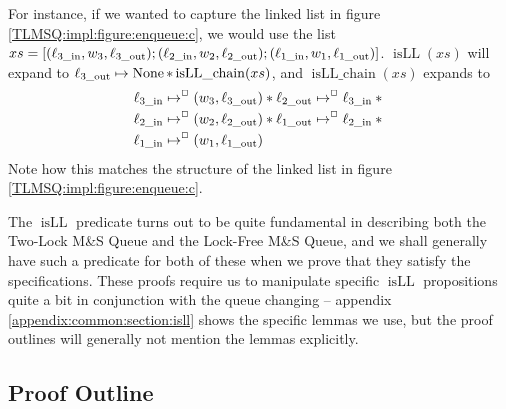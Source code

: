 \documentclass[a4paper, 10pt]{report}
\theoremstyle{definition}
\newcommand{\msq}{M\&S Queue}
\newcommand{\tlmsq}{Two-Lock \msq{}}
\newcommand{\lfmsq}{Lock-Free \msq{}}
\newcommand{\xsc}{xs}
\newcommand{\isLLchain}{\operatorname{isLL\_chain}}
\newcommand{\isLL}{\operatorname{isLL}}
\newcommand{\locinM}[1]{\loc_{#1\_\mathrm{in}}}
\newcommand{\locoutM}[1]{\loc_{#1\_\mathrm{out}}}
\newcommand{\nodeval}{\valB}
\newcommand{\nodevalM}[1]{\nodeval_{#1}}
\begin{document}
For instance, if we wanted to capture the linked list in figure \ref{TLMSQ:impl:figure:enqueue:c}, we would use the list $\xsc = [(\locinM{3}, \nodevalM{3}, \locoutM{3}); (\locinM{2}, \nodevalM{2}, \locoutM{2});  (\locinM{1}, \nodevalM{1}, \locoutM{1})]$. $\isLL(\xsc)$ will expand to $\locoutM{3} \mapsto \None \star{} \isLLchain(\xsc)$, and $\isLLchain(\xsc)$ expands to
\begin{align*}
  &\locinM{3} \mapsto^{\persistently} (\nodevalM{3}, \locoutM{3}) \star{} \locoutM{2}	\mapsto^{\persistently} \locinM{3}\star{}\\
  &\locinM{2} \mapsto^{\persistently} (\nodevalM{2}, \locoutM{2}) \star{} \locoutM{1}\mapsto^{\persistently} \locinM{2} \star{}\\
  &\locinM{1} \mapsto^{\persistently} (\nodevalM{1}, \locoutM{1})
\end{align*}
Note how this matches the structure of the linked list in figure \ref{TLMSQ:impl:figure:enqueue:c}.

The $\isLL$ predicate turns out to be quite fundamental in describing both the \tlmsq{} and the \lfmsq{}, and we shall generally have such a predicate for both of these when we prove that they satisfy the specifications. These proofs require us to manipulate specific $\isLL$ propositions quite a bit in conjunction with the queue changing -- appendix \ref{appendix:common:section:isll} shows the specific lemmas we use, but the proof outlines will generally not mention the lemmas explicitly.

\subsection{Proof Outline}
\label{TLMSQSPECS:sequential:sub:proof-outline}
\end{document}
